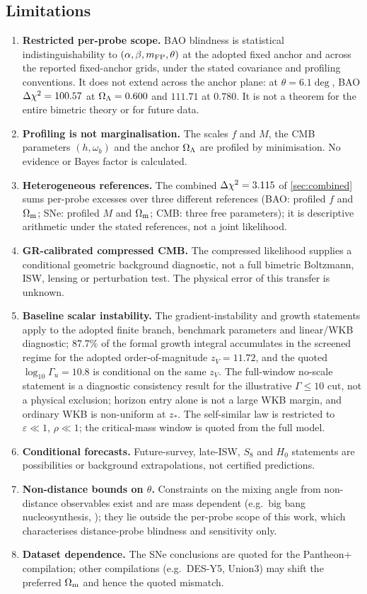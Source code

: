 \subsection{Limitations}\label{sec:limits}
\begin{enumerate}
\item \textbf{Restricted per-probe scope.} BAO blindness is statistical indistinguishability to $(\alpha,\beta,m_{\mathrm{FP}},\theta)$ at the adopted fixed anchor and across the reported fixed-anchor grids, under the stated covariance and profiling conventions. It does not extend across the anchor plane: at $\theta=6.1\deg$, BAO $\Delta\chi^2=100.57$ at $\Omega_{\Lambda}=0.600$ and $111.71$ at $0.780$. It is not a theorem for the entire bimetric theory or for future data.
\item \textbf{Profiling is not marginalisation.} The scales $f$ and $M$, the CMB parameters $(h,\omega_b)$ and the anchor $\Omega_{\Lambda}$ are profiled by minimisation. No evidence or Bayes factor is calculated.
\item \textbf{Heterogeneous references.} The combined $\Delta\chi^2=3.115$ of \cref{sec:combined} sums per-probe excesses over three different \LCDM{} references (BAO: profiled $f$ and $\Omega_{\mathrm m}$; SNe: profiled $M$ and $\Omega_{\mathrm m}$; CMB: three free parameters); it is descriptive arithmetic under the stated references, not a joint likelihood.
\item \textbf{GR-calibrated compressed CMB.} The compressed likelihood supplies a conditional geometric background diagnostic, not a full bimetric Boltzmann, ISW, lensing or perturbation test. The physical error of this transfer is unknown.
\item \textbf{Baseline scalar instability.} The gradient-instability and growth statements apply to the adopted finite branch, benchmark parameters and linear/WKB diagnostic; $87.7\%$ of the formal growth integral accumulates in the screened regime for the adopted order-of-magnitude $z_V=11.72$, and the quoted $\log_{10}\Gamma_u=10.8$ is conditional on the same $z_V$. The full-window no-scale statement is a diagnostic consistency result for the illustrative $\Gamma\le10$ cut, not a physical exclusion; horizon entry alone is not a large WKB margin, and ordinary WKB is non-uniform at $z_*$. The self-similar law is restricted to $\varepsilon\ll1$, $\rho\ll1$; the critical-mass window is quoted from the full model.
\item \textbf{Conditional forecasts.} Future-survey, late-ISW, $S_8$ and $H_0$ statements are possibilities or background extrapolations, not certified predictions.
\item \textbf{Non-distance bounds on $\theta$.} Constraints on the mixing angle from non-distance observables exist and are mass dependent (e.g.\ big bang nucleosynthesis, \citealp{Hogas2021b}); they lie outside the per-probe scope of this work, which characterises distance-probe blindness and sensitivity only.
\item \textbf{Dataset dependence.} The SNe conclusions are quoted for the Pantheon+ compilation; other compilations (e.g.\ DES-Y5, Union3) may shift the preferred $\Omega_{\mathrm m}$ and hence the quoted mismatch.
\end{enumerate}
